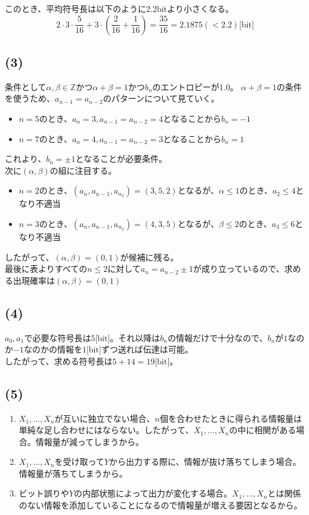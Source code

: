 \documentclass[a4paper,12pt,xelatex,ja=standard]{bxjsarticle}
\begin{document}
このとき、平均符号長は以下のように2.2bitより小さくなる。
\[
  2 \cdot 3 \cdot \frac{5}{16} + 3 \cdot \left(\frac{2}{16} + \frac{1}{16}\right)= \frac{35}{16} = 2.1875 (< 2.2) \text{[bit]}
\]

\subsection*{(3)}
条件として$\alpha, \beta \in \mathbb{Z}$かつ$\alpha + \beta = 1$かつ$b_n$のエントロピーが1.0。
$\alpha + \beta = 1$の条件を使うため、$a_{n-1} = a_{n-2}$のパターンについて見ていく。

\begin{itemize}
  \item $n = 5$のとき、$a_n = 3, a_{n-1} = a_{n-2} = 4$となることから$b_n = -1$
  \item $n = 7$のとき、$a_n = 4, a_{n-1} = a_{n-2} = 3$となることから$b_n = 1$
\end{itemize}

これより、$b_n = \pm 1$となることが必要条件。\\

次に$(\alpha, \beta)$の組に注目する。\\

\begin{itemize}
  \item $n = 2$のとき、$(a_n, a_{n-1}, a_{n_2}) = (3, 5, 2)$となるが、$\alpha \leq 1$のとき、$a_2 \leq 4$となり不適当
  \item $n = 3$のとき、$(a_n, a_{n-1}, a_{n_2}) = (4, 3, 5)$となるが、$\beta \leq 2$のとき、$a_3 \leq 6$となり不適当
\end{itemize}

したがって、$(\alpha, \beta) = (0, 1)$が候補に残る。\\

最後に表よりすべての$n \leq 2$に対して$a_{n} = a_{n-2} \pm 1$が成り立っているので、求める出現確率は$(\alpha, \beta) = (0, 1)$

\subsection*{(4)}
$a_0, a_1$で必要な符号長は$5 \text{[bit]}$。それ以降は$b_n$の情報だけで十分なので、$b_n$が$1$なのか$-1$なのかの情報を$1 \text{[bit]}$ずつ送れば伝達は可能。\\
したがって、求める符号長は$5 + 14 = 19\text{[bit]}$。

\subsection*{(5)}
\begin{enumerate}
  \item $X_1, \dots, X_n$が互いに独立でない場合、$n$個を合わせたときに得られる情報量は単純な足し合わせにはならない。したがって、$X_1, \dots, X_n$の中に相関がある場合。情報量が減ってしまうから。
  \item $X_1, \dots, X_n$を受け取って$Y$から出力する際に、情報が抜け落ちてしまう場合。情報量が落ちてしまうから。
  \item ビット誤りや$Y$の内部状態によって出力が変化する場合。$X_1, \dots, X_n$とは関係のない情報を添加していることになるので情報量が増える要因となるから。
\end{enumerate}
\end{document}

